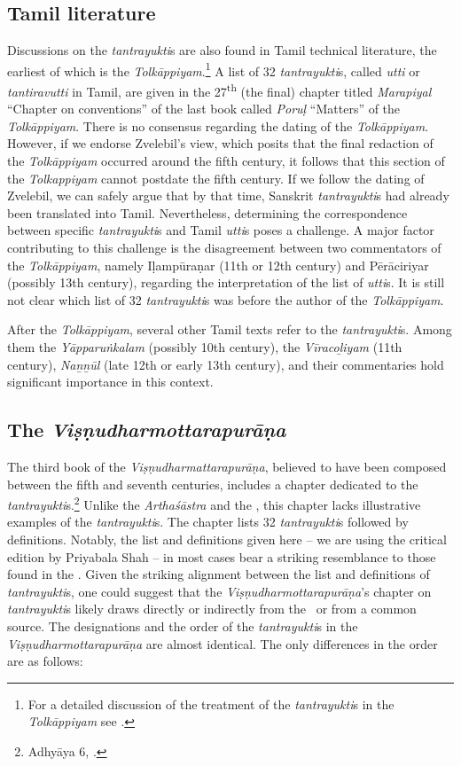 \subsection{Tamil literature}
Discussions on the \emph{tantrayukti}s are also found in Tamil technical 
literature, the earliest of which is the \emph{Tolkāppiyam}.\footnote{For a 
detailed discussion of the treatment of the \emph{tantrayukti}s in the 
\emph{Tolkāppiyam} see \cite{chev-2009}.} 
A list of 32 \emph{tantrayukti}s, called \emph{utti} or \emph{tantiravutti} in 
Tamil, are given in the 27\textsuperscript{th} (the final) chapter titled 
\emph{Marapiyal} “Chapter on conventions” of the last book called 
\emph{Poruḷ} 
“Matters” of the \emph{Tolkāppiyam}. There is no consensus regarding the 
dating 
of the \emph{Tolkāppiyam}. However, if we endorse Zvelebil's view, which posits 
that the final redaction of the \emph{Tolkāppiyam} occurred around the fifth 
century\CE, it follows that this section of the \emph{Tolkappiyam} cannot 
postdate 
the fifth century. If we follow the dating of Zvelebil, we can safely argue that by 
that time, Sanskrit \emph{tantrayukti}s had already been translated into Tamil. 
Nevertheless, determining the correspondence between specific 
\emph{tantrayukti}s and Tamil \emph{utti}s poses a challenge. A major factor 
contributing to this challenge is the disagreement between two commentators of 
the \emph{Tolkāppiyam}, namely Iḷampūraṇar (11th or 12th century) and 
Pērāciriyar (possibly 13th century), regarding the interpretation of the list of 
\emph{utti}s. It is still not clear which list of 32 \emph{tantrayukti}s was before 
the author of the \emph{Tolkāppiyam}. 

After the \emph{Tolkāppiyam}, several other Tamil texts refer to the 
\emph{tantrayukti}s. Among them the \emph{Yāpparuṅkalam} (possibly 10th 
century), the \emph{Vīraco\b{l}iyam} (11th century), 
\emph{Na\b{n}\b{n}ūl} (late 12th or early 13th century), and 
their commentaries hold significant importance in this context.

\subsection{The \emph{Viṣṇudharmottarapurāṇa}}
The third book of the \emph{Viṣṇudharmattarapurāṇa}, believed to have
been composed between the fifth and seventh centuries, includes a chapter
dedicated to the \emph{tantrayukti}s.\footnote{Adhyāya 6,
    \cite[13--14]{shah-1958}.} Unlike the \emph{Arthaśāstra} and the \SS,
    this chapter lacks illustrative examples of the \emph{tantrayukti}s. The
    chapter lists 32 \emph{tantrayukti}s followed by definitions. Notably,
    the list and definitions given here -- we are using the critical
    edition by Priyabala Shah -- in most cases bear a striking resemblance to
    those found in the \SS. Given the striking alignment between the list and
    definitions of \emph{tantrayukti}s, one could suggest that the
    \emph{Viṣṇudharmottarapurāṇa}'s chapter on \emph{tantrayukti}s likely
    draws directly or indirectly from the \SS\ or from a common
    source. The designations and the order of the \emph{tantrayukti}s in the
    \emph{Viṣṇudharmottarapurāṇa} are almost identical. The only differences
    in the order are as follows:

